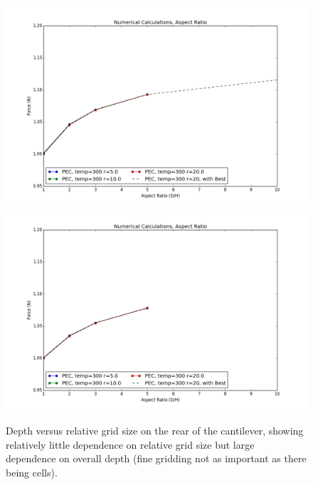 \documentclass[11pt,traditabstract]{article}
\begin{document}
\begin{figure}[h]
\centering
\includegraphics[width=5.5in]{depth_v_gridding}
\includegraphics[width=5.5in]{depth_v_gridding_finite}
\caption{Depth versus relative grid size on the rear of the cantilever, showing relatively little dependence on relative grid size but large dependence on overall depth (fine gridding not as important as there being cells).}\label{fig:depth}
\end{figure}
\end{document}
